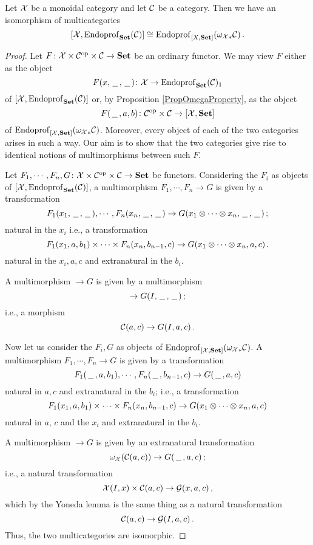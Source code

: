\documentclass{report}[11pt]
\begin{document}
\begin{theorem}
  \label{StokessTheorem}
  Let $\mathcal X$ be a monoidal category and let ${\mathcal{C}}$ be a category.  
  Then we have an isomorphism of multicategories
  \[
    [\mathcal X,\operatorname{Endoprof}_{{\normalfont\textbf{Set}}}({\mathcal{C}})] \cong \operatorname{Endoprof}_{[X,{\normalfont\textbf{Set}}]}({\omega_\mathcal X}_*{\mathcal{C}})\,.
    \]
\end{theorem}
\begin{proof}
  Let $F \colon \mathcal X\times{\mathcal{C}}^{\mathrm{op}}\times{\mathcal{C}} \to {\normalfont\textbf{Set}}$ be an ordinary functor.  
  We may view $F$ either as the object
  \[
    F(x, \,\underline{\hspace{1.5ex}}\,, \,\underline{\hspace{1.5ex}}\,) \colon \mathcal X \to \operatorname{Endoprof}_{\normalfont\textbf{Set}}({\mathcal{C}})_1
    \]
  of $[\mathcal X,\operatorname{Endoprof}_{{\normalfont\textbf{Set}}}({\mathcal{C}})]$ or, by Proposition \ref{PropOmegaProperty}, as the object
  \[
    F(\,\underline{\hspace{1.5ex}}\,, a, b) \colon {\mathcal{C}}^{\mathrm{op}} \times {\mathcal{C}} \to [\mathcal X,{\normalfont\textbf{Set}}]
    \]
  of $\operatorname{Endoprof}_{[\mathcal X,{\normalfont\textbf{Set}}]}({\omega_\mathcal X}_*{\mathcal{C}})$.
  Moreover, every object of each of the two categories arises in such a way.  
  Our aim is to show that the two categories give rise to identical notions of multimorphisms between such $F$.

  Let $F_1,\cdots,F_n,G \colon \mathcal X \times {\mathcal{C}}^{\mathrm{op}}\times{\mathcal{C}}\to {\normalfont\textbf{Set}}$ be functors.  
  Considering the $F_i$ as objects of $[\mathcal X,\operatorname{Endoprof}_{\normalfont\textbf{Set}}({\mathcal{C}})]$, a multimorphism $F_1,\cdots,F_n\to G$ is given by a transformation
  \[
    F_1(x_1,\,\underline{\hspace{1.5ex}}\,,\,\underline{\hspace{1.5ex}}\,),\cdots, F_n(x_n,\,\underline{\hspace{1.5ex}}\,,\,\underline{\hspace{1.5ex}}\,) \to G(x_1\otimes\cdots\otimes x_n,\,\underline{\hspace{1.5ex}}\,,\,\underline{\hspace{1.5ex}}\,)\,;
    \]
  natural in the $x_i$ i.e., a transformation
  \[
    F_1(x_1,a,b_1)\times\cdots\times F_n(x_n,b_{n-1},c) \to G(x_1\otimes\cdots\otimes x_n,a,c)\,.
    \]
  natural in the $x_i,a,c$ and extranatural in the $b_i$.

  A multimorphism $\to G$ is given by a multimorphism
  \[
    \to G(I,\,\underline{\hspace{1.5ex}}\,,\,\underline{\hspace{1.5ex}}\,)\,;
    \]
  i.e., a morphism
  \[
    {\mathcal{C}}(a,c) \to G(I,a,c)\,.
    \]

  Now let us consider the $F_i,G$ as objects of $\operatorname{Endoprof}_{[\mathcal X,{\normalfont\textbf{Set}}]}({\omega_\mathcal X}_*{\mathcal{C}})$.  
  A multimorphism $F_1,\cdots,F_n\to G$ is given by a transformation
  \[
    F_1(\,\underline{\hspace{1.5ex}}\,,a,b_1),\cdots,F_n(\,\underline{\hspace{1.5ex}}\,,b_{n-1},c) \to G(\,\underline{\hspace{1.5ex}}\,,a,c)
    \]
  natural in $a,c$ and extranatural in the $b_i$; i.e., a transformation
  \[
    F_1(x_1,a,b_1)\times\cdots\times F_n(x_n,b_{n-1},c) \to G(x_1\otimes\cdots\otimes x_n,a,c)
    \]
  natural in $a$, $c$ and the $x_i$ and extranatural in the $b_i$.  

  A multimorphism $\to G$ is given by an extranatural transformation
  \[
    \omega_\mathcal X({\mathcal{C}}(a,c)) \to G(\,\underline{\hspace{1.5ex}}\,,a,c)\,;
    \]
  i.e., a natural transformation
  \[
    \mathcal X(I,x)\times{\mathcal{C}}(a,c) \to \mathcal G(x,a,c)\,,
    \]
  which by the Yoneda lemma is the same thing as a natural transformation
  \[
    {\mathcal{C}}(a,c) \to \mathcal G(I,a,c)\,.
    \]
  Thus, the two multicategories are isomorphic.
\end{proof}
\end{document}
